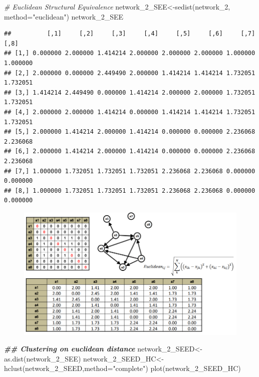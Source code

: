 \documentclass[
  notitlepage,
  onecolumn,
  openany]{book}
\newenvironment{Shaded}{\begin{snugshade}}{\end{snugshade}}
\newcommand{\AttributeTok}[1]{\textcolor[rgb]{0.77,0.63,0.00}{#1}}
\newcommand{\CommentTok}[1]{\textcolor[rgb]{0.56,0.35,0.01}{\textit{#1}}}
\newcommand{\DocumentationTok}[1]{\textcolor[rgb]{0.56,0.35,0.01}{\textbf{\textit{#1}}}}
\newcommand{\FunctionTok}[1]{\textcolor[rgb]{0.00,0.00,0.00}{#1}}
\newcommand{\NormalTok}[1]{#1}
\newcommand{\OtherTok}[1]{\textcolor[rgb]{0.56,0.35,0.01}{#1}}
\newcommand{\StringTok}[1]{\textcolor[rgb]{0.31,0.60,0.02}{#1}}
\begin{document}
\begin{Shaded}
\begin{Highlighting}[]
\CommentTok{\# Euclidean Structural Equivalence}
\NormalTok{network\_2\_SEE}\OtherTok{\textless{}{-}}\FunctionTok{sedist}\NormalTok{(network\_2, }\AttributeTok{method=}\StringTok{"euclidean"}\NormalTok{)}
\NormalTok{network\_2\_SEE}
\end{Highlighting}
\end{Shaded}

\begin{verbatim}
##          [,1]     [,2]     [,3]     [,4]     [,5]     [,6]     [,7]     [,8]
## [1,] 0.000000 2.000000 1.414214 2.000000 2.000000 2.000000 1.000000 1.000000
## [2,] 2.000000 0.000000 2.449490 2.000000 1.414214 1.414214 1.732051 1.732051
## [3,] 1.414214 2.449490 0.000000 1.414214 2.000000 2.000000 1.732051 1.732051
## [4,] 2.000000 2.000000 1.414214 0.000000 1.414214 1.414214 1.732051 1.732051
## [5,] 2.000000 1.414214 2.000000 1.414214 0.000000 0.000000 2.236068 2.236068
## [6,] 2.000000 1.414214 2.000000 1.414214 0.000000 0.000000 2.236068 2.236068
## [7,] 1.000000 1.732051 1.732051 1.732051 2.236068 2.236068 0.000000 0.000000
## [8,] 1.000000 1.732051 1.732051 1.732051 2.236068 2.236068 0.000000 0.000000
\end{verbatim}

\begin{figure}[h!]

{\centering \includegraphics[width=0.7\linewidth]{images/11-Subgroups and Structural Equivalence/Untitled 10} 

}

\end{figure}

\begin{Shaded}
\begin{Highlighting}[]
\DocumentationTok{\#\# Clustering on euclidean distance}
\NormalTok{network\_2\_SEED}\OtherTok{\textless{}{-}}\FunctionTok{as.dist}\NormalTok{(network\_2\_SEE)}
\NormalTok{network\_2\_SEED\_HC}\OtherTok{\textless{}{-}}\FunctionTok{hclust}\NormalTok{(network\_2\_SEED,}\AttributeTok{method=}\StringTok{"complete"}\NormalTok{)}
\FunctionTok{plot}\NormalTok{(network\_2\_SEED\_HC)}
\end{Highlighting}
\end{Shaded}
\end{document}

